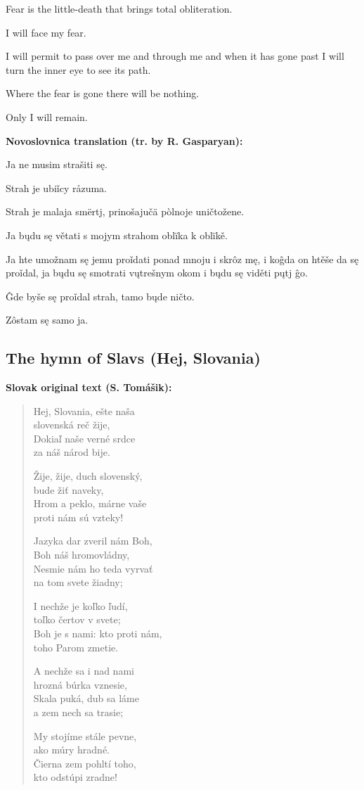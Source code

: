 Fear is the little-death that brings total obliteration.

I will face my fear.

I will permit to pass over me and through me and when it has gone past I will turn the inner eye to see its path.

Where the fear is gone there will be nothing.

Only I will remain. 

\textbf{Novoslovnica translation (tr. by R. Gasparyan):}

Ja ne musim strašiti sę.

Strah je ubiǐcy råzuma.

Strah je malaja smërtj, prinošajučä pòlnoje uničtožene.

Ja bųdu sę větati s mojym strahom oblïka k oblïkě.

Ja hte umožnam sę jemu proǐdati ponad mnoju i skrôz mę, i koĝda on htěše da sę proǐdal, ja bųdu sę smotrati vųtrešnym okom i bųdu sę viděti pųtj ĝo.

Ĝde byše sę proǐdal strah, tamo bųde ničto.

Zôstam sę samo ja.

\subsection{The hymn of Slavs (Hej, Slovania)}

\textbf{Slovak original text (S. Tomášik):}

\begin{verse}
	Hej, Slovania, ešte naša \\
	slovenská reč žije, \\
	Dokiaľ naše verné srdce \\
	za náš národ bije.
	
	Žije, žije, duch slovenský, \\
	bude žiť naveky, \\
	Hrom a peklo, márne vaše \\
	proti nám sú vzteky!
	
	Jazyka dar zveril nám Boh, \\
	Boh náš hromovládny, \\
	Nesmie nám ho teda vyrvať \\
	na tom svete žiadny;
	
	I nechže je koľko ľudí, \\
	toľko čertov v svete; \\
	Boh je s nami: kto proti nám, \\
	toho Parom zmetie.
	
	A nechže sa i nad nami \\
	hrozná búrka vznesie, \\
	Skala puká, dub sa láme \\
	a zem nech sa trasie;
	
	My stojíme stále pevne, \\
	ako múry hradné. \\
	Čierna zem pohltí toho, \\
	kto odstúpi zradne!
\end{verse}

